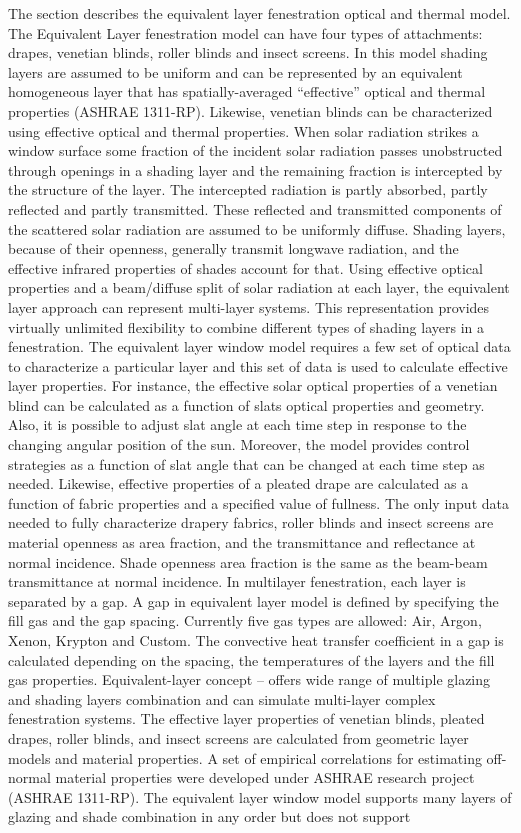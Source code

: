 The section describes the equivalent layer fenestration optical and thermal model. The Equivalent Layer fenestration model can have four types of attachments: drapes, venetian blinds, roller blinds and insect screens. In this model shading layers are assumed to be uniform and can be represented by an equivalent homogeneous layer that has spatially-averaged ``effective'' optical and thermal properties (ASHRAE 1311-RP). Likewise, venetian blinds can be characterized using effective optical and thermal properties. When solar radiation strikes a window surface some fraction of the incident solar radiation passes unobstructed through openings in a shading layer and the remaining fraction is intercepted by the structure of the layer. The intercepted radiation is partly absorbed, partly reflected and partly transmitted. These reflected and transmitted components of the scattered solar radiation are assumed to be uniformly diffuse. Shading layers, because of their openness, generally transmit longwave radiation, and the effective infrared properties of shades account for that. Using effective optical properties and a beam/diffuse split of solar radiation at each layer, the equivalent layer approach can represent multi-layer systems. This representation provides virtually unlimited flexibility to combine different types of shading layers in a fenestration. The equivalent layer window model requires a few set of optical data to characterize a particular layer and this set of data is used to calculate effective layer properties. For instance, the effective solar optical properties of a venetian blind can be calculated as a function of slats optical properties and geometry. Also, it is possible to adjust slat angle at each time step in response to the changing angular position of the sun. Moreover, the model provides control strategies as a function of slat angle that can be changed at each time step as needed. Likewise, effective properties of a pleated drape are calculated as a function of fabric properties and a specified value of fullness. The only input data needed to fully characterize drapery fabrics, roller blinds and insect screens are material openness as area fraction, and the transmittance and reflectance at normal incidence. Shade openness area fraction is the same as the beam-beam transmittance at normal incidence. In multilayer fenestration, each layer is separated by a gap. A gap in equivalent layer model is defined by specifying the fill gas and the gap spacing. Currently five gas types are allowed: Air, Argon, Xenon, Krypton and Custom. The convective heat transfer coefficient in a gap is calculated depending on the spacing, the temperatures of the layers and the fill gas properties. Equivalent-layer concept -- offers wide range of multiple glazing and shading layers combination and can simulate multi-layer complex fenestration systems. The effective layer properties of venetian blinds, pleated drapes, roller blinds, and insect screens are calculated from geometric layer models and material properties. A set of empirical correlations for estimating off-normal material properties were developed under ASHRAE research project (ASHRAE 1311-RP). The equivalent layer window model supports many layers of glazing and shade combination in any order but does not support 